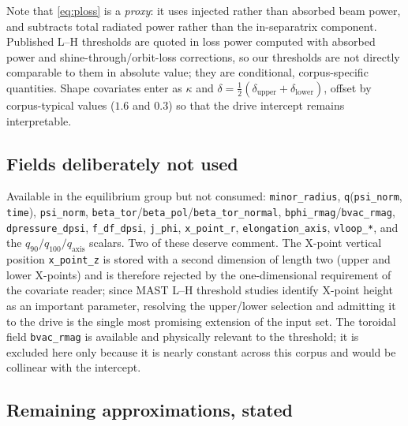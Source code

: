 Note that \eqref{eq:ploss} is a \emph{proxy}: it uses injected rather than
absorbed beam power, and subtracts total radiated power rather than the
in-separatrix component. Published L--H thresholds are quoted in loss power
computed with absorbed power and shine-through/orbit-loss corrections, so
our thresholds are not directly comparable to them in absolute value; they
are conditional, corpus-specific quantities. Shape covariates enter as
$\kappa$ and $\delta = \tfrac12(\delta_{\mathrm{upper}} +
\delta_{\mathrm{lower}})$, offset by corpus-typical values ($1.6$ and
$0.3$) so that the drive intercept remains interpretable.

\subsection{Fields deliberately not used}
\label{app:eq-unused}

Available in the equilibrium group but not consumed:
\texttt{minor\_radius}, \texttt{q}(\texttt{psi\_norm}, \texttt{time}),
\texttt{psi\_norm}, \texttt{beta\_tor}/\texttt{beta\_pol}/\texttt{beta\_tor\_normal},
\texttt{bphi\_rmag}/\texttt{bvac\_rmag}, \texttt{dpressure\_dpsi},
\texttt{f\_df\_dpsi}, \texttt{j\_phi}, \texttt{x\_point\_r},
\texttt{elongation\_axis}, \texttt{vloop\_*}, and the $q_{90}/q_{100}/q_{\mathrm{axis}}$
scalars. Two of these deserve comment. The X-point vertical position
\texttt{x\_point\_z} is stored with a second dimension of length two (upper
and lower X-points) and is therefore rejected by the one-dimensional
requirement of the covariate reader; since MAST L--H threshold studies
identify X-point height as an important parameter, resolving the
upper/lower selection and admitting it to the drive is the single most
promising extension of the input set. The toroidal field
\texttt{bvac\_rmag} is available and physically relevant to the threshold;
it is excluded here only because it is nearly constant across this corpus
and would be collinear with the intercept.

\subsection{Remaining approximations, stated}
\label{app:eq-caveats}

